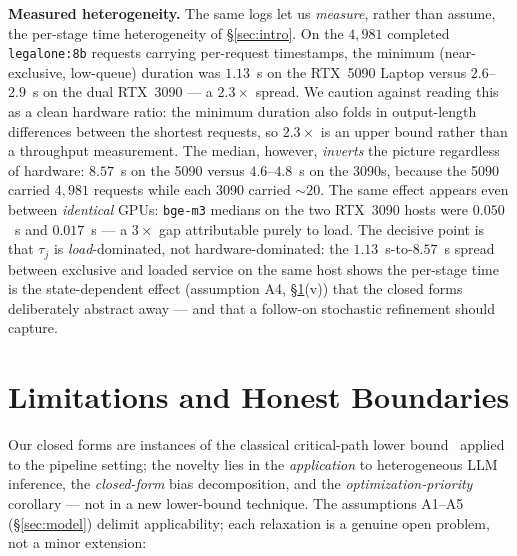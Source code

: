 \documentclass[11pt]{article}
\begin{document}
\textbf{Measured heterogeneity.} The same logs let us \emph{measure}, rather than assume, the per-stage time heterogeneity of \S\ref{sec:intro}. On the $4{,}981$ completed \texttt{legalone:8b} requests carrying per-request timestamps, the minimum (near-exclusive, low-queue) duration was $1.13$~s on the RTX~5090 Laptop versus $2.6$--$2.9$~s on the dual RTX~3090 --- a $2.3\times$ spread. We caution against reading this as a clean hardware ratio: the minimum duration also folds in output-length differences between the shortest requests, so $2.3\times$ is an upper bound rather than a throughput measurement. The median, however, \emph{inverts} the picture regardless of hardware: $8.57$~s on the 5090 versus $4.6$--$4.8$~s on the 3090s, because the 5090 carried $4{,}981$ requests while each 3090 carried $\sim20$. The same effect appears even between \emph{identical} GPUs: \texttt{bge-m3} medians on the two RTX~3090 hosts were $0.050$~s and $0.017$~s --- a $3\times$ gap attributable purely to load. The decisive point is that $\tau_j$ is \emph{load}-dominated, not hardware-dominated: the $1.13$~s-to-$8.57$~s spread between exclusive and loaded service on the same host shows the per-stage time is the state-dependent effect (assumption A4, \S\ref{sec:limitations}(v)) that the closed forms deliberately abstract away --- and that a follow-on stochastic refinement should capture.

\section{Limitations and Honest Boundaries}\label{sec:limitations}

Our closed forms are instances of the classical critical-path lower bound~\cite{r2,r4} applied to the pipeline setting; the novelty lies in the \emph{application} to heterogeneous LLM inference, the \emph{closed-form} bias decomposition, and the \emph{optimization-priority} corollary --- not in a new lower-bound technique. The assumptions A1--A5 (\S\ref{sec:model}) delimit applicability; each relaxation is a genuine open problem, not a minor extension:
\end{document}
